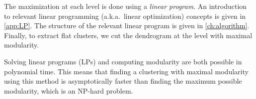 The maximization at each level is done using a \emph{linear program}. An introduction to relevant linear programming (a.k.a.\ linear optimization) concepts is given in \autoref{app:LP}. The structure of the relevant linear program is given in \autoref{ch:algorithm}. Finally, to extract flat clusters, we cut the dendrogram at the level with maximal modularity.

Solving linear programs (LPs) and computing modularity are both possible in polynomial time. This means that finding a clustering with maximal modularity using this method is asymptotically faster than finding the maximum possible modularity, which is an NP-hard problem.

%
%

